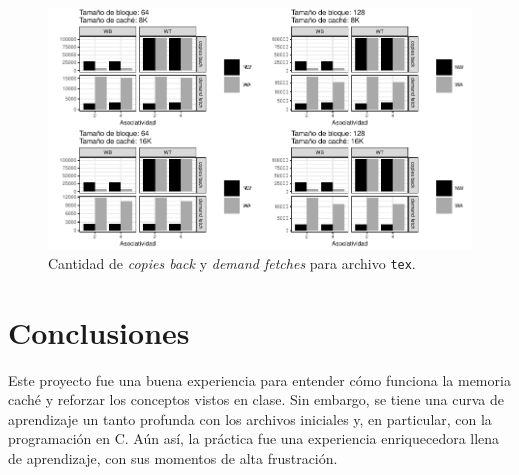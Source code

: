 \documentclass{article}
\begin{document}
\begin{figure}[H]
    \centering
    \includegraphics[width=\textwidth]{4_memory_bandwidth_wna_wa_tex.pdf}
    \caption{Cantidad de \textit{copies back} y \textit{demand fetches} para archivo \texttt{tex}.}
    \label{fig:4_memory_bandwidth_tex}
\end{figure}















\section{Conclusiones}


Este proyecto fue una buena experiencia para entender cómo funciona la memoria caché y reforzar los conceptos vistos en clase. Sin embargo, se tiene una curva de aprendizaje un tanto profunda con los archivos iniciales y, en particular, con la programación en C. Aún así, la práctica fue una experiencia enriquecedora llena de aprendizaje, con sus momentos de alta frustración.






\printbibliography
\nocite{*}
\end{document}
